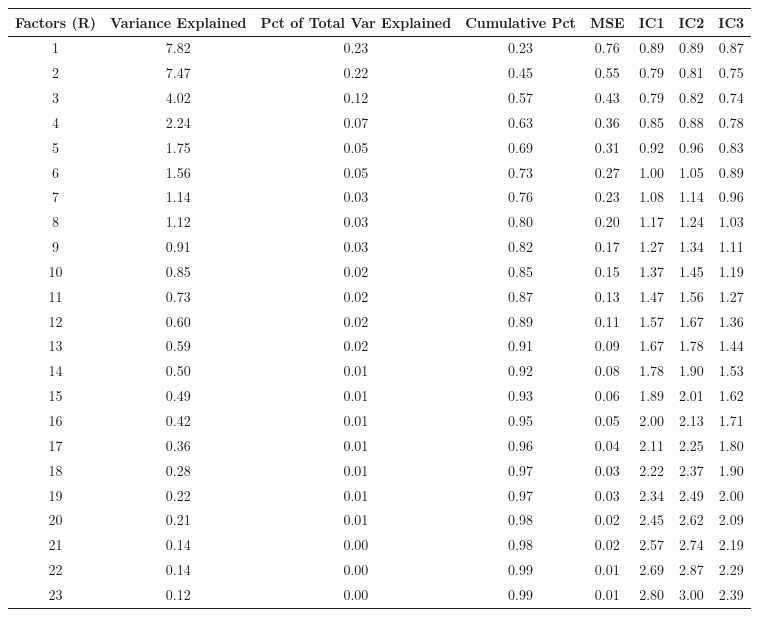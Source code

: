 \documentclass[11pt, letterpaper]{article}\usepackage[]{graphicx}\usepackage[]{color}
\begin{document}
\begin{table}[H]
\centering
\begingroup\scriptsize
\begin{tabular}{cccccccc}
  \hline
Factors (R) & Variance Explained & Pct of Total Var Explained & Cumulative Pct & MSE & IC1 & IC2 & IC3 \\ 
  \hline
  1 & 7.82 & 0.23 & 0.23 & 0.76 & 0.89 & 0.89 & 0.87 \\ 
    2 & 7.47 & 0.22 & 0.45 & 0.55 & 0.79 & 0.81 & 0.75 \\ 
    3 & 4.02 & 0.12 & 0.57 & 0.43 & 0.79 & 0.82 & 0.74 \\ 
    4 & 2.24 & 0.07 & 0.63 & 0.36 & 0.85 & 0.88 & 0.78 \\ 
    5 & 1.75 & 0.05 & 0.69 & 0.31 & 0.92 & 0.96 & 0.83 \\ 
    6 & 1.56 & 0.05 & 0.73 & 0.27 & 1.00 & 1.05 & 0.89 \\ 
    7 & 1.14 & 0.03 & 0.76 & 0.23 & 1.08 & 1.14 & 0.96 \\ 
    8 & 1.12 & 0.03 & 0.80 & 0.20 & 1.17 & 1.24 & 1.03 \\ 
    9 & 0.91 & 0.03 & 0.82 & 0.17 & 1.27 & 1.34 & 1.11 \\ 
   10 & 0.85 & 0.02 & 0.85 & 0.15 & 1.37 & 1.45 & 1.19 \\ 
   11 & 0.73 & 0.02 & 0.87 & 0.13 & 1.47 & 1.56 & 1.27 \\ 
   12 & 0.60 & 0.02 & 0.89 & 0.11 & 1.57 & 1.67 & 1.36 \\ 
   13 & 0.59 & 0.02 & 0.91 & 0.09 & 1.67 & 1.78 & 1.44 \\ 
   14 & 0.50 & 0.01 & 0.92 & 0.08 & 1.78 & 1.90 & 1.53 \\ 
   15 & 0.49 & 0.01 & 0.93 & 0.06 & 1.89 & 2.01 & 1.62 \\ 
   16 & 0.42 & 0.01 & 0.95 & 0.05 & 2.00 & 2.13 & 1.71 \\ 
   17 & 0.36 & 0.01 & 0.96 & 0.04 & 2.11 & 2.25 & 1.80 \\ 
   18 & 0.28 & 0.01 & 0.97 & 0.03 & 2.22 & 2.37 & 1.90 \\ 
   19 & 0.22 & 0.01 & 0.97 & 0.03 & 2.34 & 2.49 & 2.00 \\ 
   20 & 0.21 & 0.01 & 0.98 & 0.02 & 2.45 & 2.62 & 2.09 \\ 
   21 & 0.14 & 0.00 & 0.98 & 0.02 & 2.57 & 2.74 & 2.19 \\ 
   22 & 0.14 & 0.00 & 0.99 & 0.01 & 2.69 & 2.87 & 2.29 \\ 
   23 & 0.12 & 0.00 & 0.99 & 0.01 & 2.80 & 3.00 & 2.39 \\ 

\end{tabular}
\end{table}
\end{document}
